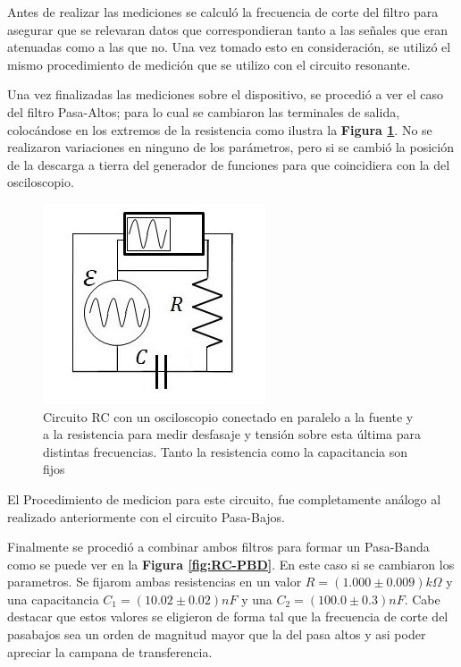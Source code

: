 \documentclass[11pt,a4paper]{article}
\begin{document}
Antes de realizar las mediciones se calculó la frecuencia de corte del filtro para asegurar que se relevaran datos que correspondieran tanto a las señales que eran atenuadas como a las que no. Una vez tomado esto en consideración, se utilizó el mismo procedimiento de medición que se utilizo con el circuito resonante. 

Una vez finalizadas las mediciones sobre el dispositivo, se procedió a ver el caso del filtro Pasa-Altos; para lo cual se cambiaron las terminales de salida, colocándose en los extremos de la resistencia como ilustra la \textbf{Figura \ref{fig:RC-PA}}. No se realizaron variaciones en ninguno de los parámetros, pero si se cambió la posición de la descarga a tierra del generador de funciones para que coincidiera con la del osciloscopio.

\begin{figure}[h]
\centering
\includegraphics[scale=0.9]{Circuito-RC-Pasa-Altos}
  \caption{Circuito RC con un osciloscopio conectado en paralelo a la fuente y a la resistencia para medir desfasaje y tensión sobre esta última para distintas frecuencias. Tanto la resistencia como la capacitancia son fijos}
  \label{fig:RC-PA}
\end{figure}

El Procedimiento de medicion para este circuito, fue completamente análogo al realizado anteriormente con el circuito Pasa-Bajos. 

Finalmente se procedió a combinar ambos filtros para formar un Pasa-Banda como se puede ver en la \textbf{Figura \ref{fig:RC-PBD}}. En este caso si se cambiaron los parametros. Se fijarom ambas resistencias en un valor $R = (1.000 \pm 0.009)k\Omega$ y una capacitancia $C_{1} = (10.02 \pm 0.02)nF$ y una $C_{2} = (100.0 \pm 0.3)nF$. Cabe destacar que estos valores se eligieron de forma tal que la frecuencia de corte del pasabajos sea un orden de magnitud mayor que la del pasa altos y asi poder apreciar la campana de transferencia. 
\end{document}

